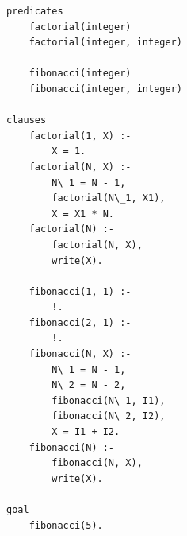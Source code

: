\begin{lstlisting}[style=lispStyle, caption={ База знаний нахождения факториала и чисел фибоначчи},
                    label={lst:fact}]
predicates
    factorial(integer)
    factorial(integer, integer)

    fibonacci(integer)
    fibonacci(integer, integer)

clauses
    factorial(1, X) :-
        X = 1.
    factorial(N, X) :-
        N\_1 = N - 1,
        factorial(N\_1, X1),
        X = X1 * N.
    factorial(N) :-
        factorial(N, X),
        write(X).

    fibonacci(1, 1) :-
        !.
    fibonacci(2, 1) :-
        !.
    fibonacci(N, X) :-
        N\_1 = N - 1,
        N\_2 = N - 2,
        fibonacci(N\_1, I1),
        fibonacci(N\_2, I2),
        X = I1 + I2.
    fibonacci(N) :-
        fibonacci(N, X),
        write(X).

goal
    fibonacci(5).

\end{lstlisting}

